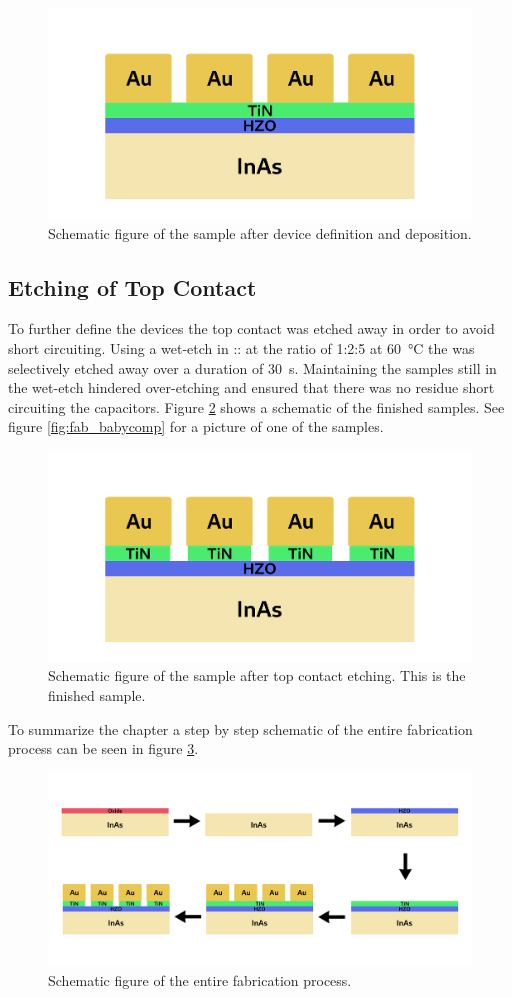 \documentclass[11pt,twoside]{eitExjobb}
\begin{document}
\begin{figure}[htbp]
    \centering
    \includegraphics[width=.45\linewidth]{fig/fabproc/fab_4.png}
    \caption{Schematic figure of the sample after device definition and 
    deposition.}\label{fig:fab_4}
\end{figure}

\subsection{Etching of Top Contact}
To further define the devices the  top contact was etched away in order
to avoid short circuiting. Using a wet-etch in :: at
the ratio of 1:2:5 at \SI{60}{\celsius} the  was selectively etched
away over a duration of \SI{30}{\second}. Maintaining the samples still in the
wet-etch hindered over-etching and ensured that there was no residue 
short circuiting the capacitors. Figure \ref{fig:fab_5} shows a schematic of
the finished samples. See figure \ref{fig:fab_babycomp} for a picture of one of
the samples.

\begin{figure}[htbp]
    \centering
    \includegraphics[width=.45\linewidth]{fig/fabproc/fab_5.png}
    \caption{Schematic figure of the sample after top contact etching. This is
    the finished sample.}\label{fig:fab_5}
\end{figure}

To summarize the chapter a step by step schematic of the entire fabrication
process can be seen in figure \ref{fig:fab_done}.

\begin{figure}[htbp]
    \centering
    \includegraphics[width=.80\linewidth]{fig/fabproc/fab_done.png}
    \caption{Schematic figure of the entire fabrication process.}\label{fig:fab_done}
\end{figure}
\end{document}
